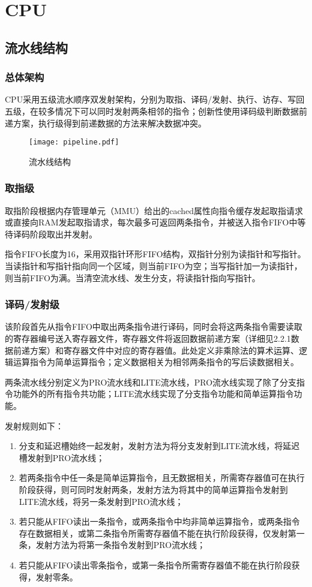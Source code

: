 \chapter{CPU}

\section{流水线结构}

\subsection{总体架构}

CPU采用五级流水顺序双发射架构，分别为取指、译码/发射、执行、访存、写回五级，在较多情况下可以同时发射两条相邻的指令；创新性使用译码级判断数据前递方案，执行级得到前递数据的方法来解决数据冲突。

\begin{figure}[htbp]
	\centering
	\texttt{[image: pipeline.pdf]}
	\caption{流水线结构}
	\label{fig:pipeline}
\end{figure}

\subsection{取指级}
取指阶段根据内存管理单元（MMU）给出的cached属性向指令缓存发起取指请求或直接向RAM发起取指请求，每次最多可返回两条指令，并被送入指令FIFO中等待译码阶段取出并发射。

指令FIFO长度为16，采用双指针环形FIFO结构，双指针分别为读指针和写指针。当读指针和写指针指向同一个区域，则当前FIFO为空；当写指针加一为读指针，则当前FIFO为满。当清空流水线、发生分支，将读指针指向写指针。

\subsection{译码/发射级}
该阶段首先从指令FIFO中取出两条指令进行译码，同时会将这两条指令需要读取的寄存器编号送入寄存器文件，寄存器文件将返回数据前递方案（详细见2.2.1数据前递方案）和寄存器文件中对应的寄存器值。此处定义非乘除法的算术运算、逻辑运算指令为简单运算指令；定义数据相关为相邻两条指令的写后读数据相关。

两条流水线分别定义为PRO流水线和LITE流水线，PRO流水线实现了除了分支指令功能外的所有指令共功能；LITE流水线实现了分支指令功能和简单运算指令功能。

发射规则如下：

\begin{enumerate}
    \item 分支和延迟槽始终一起发射，发射方法为将分支发射到LITE流水线，将延迟槽发射到PRO流水线；
    \item 若两条指令中任一条是简单运算指令，且无数据相关，所需寄存器值可在执行阶段获得，则可同时发射两条，发射方法为将其中的简单运算指令发射到LITE流水线，将另一条发射到PRO流水线；
    \item 若只能从FIFO读出一条指令，或两条指令中均非简单运算指令，或两条指令存在数据相关，或第二条指令所需寄存器值不能在执行阶段获得，仅发射第一条，发射方法为将第一条指令发射到PRO流水线；
    \item 若只能从FIFO读出零条指令，或第一条指令所需寄存器值不能在执行阶段获得，发射零条。
\end{enumerate}

